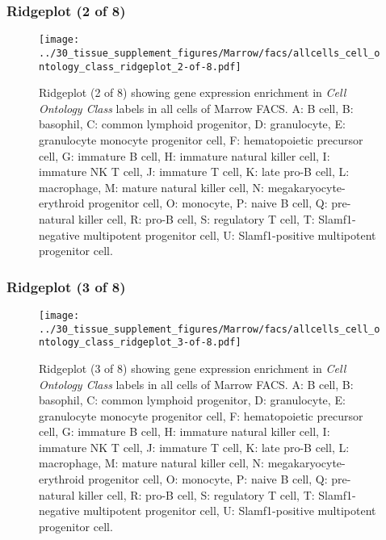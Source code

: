 \clearpage

\subsubsection{Ridgeplot (2 of 8)}
\begin{figure}[h]
\centering
\texttt{[image: ../30\_tissue\_supplement\_figures/Marrow/facs/allcells\_cell\_ontology\_class\_ridgeplot\_2-of-8.pdf]}

\caption{ Ridgeplot (2 of 8)  showing gene expression enrichment in \emph{Cell Ontology Class} labels in all cells of Marrow FACS. A: B cell, B: basophil, C: common lymphoid progenitor, D: granulocyte, E: granulocyte monocyte progenitor cell, F: hematopoietic precursor cell, G: immature B cell, H: immature natural killer cell, I: immature NK T cell, J: immature T cell, K: late pro-B cell, L: macrophage, M: mature natural killer cell, N: megakaryocyte-erythroid progenitor cell, O: monocyte, P: naive B cell, Q: pre-natural killer cell, R: pro-B cell, S: regulatory T cell, T: Slamf1-negative multipotent progenitor cell, U: Slamf1-positive multipotent progenitor cell.}
\end{figure}


\clearpage

\subsubsection{Ridgeplot (3 of 8)}
\begin{figure}[h]
\centering
\texttt{[image: ../30\_tissue\_supplement\_figures/Marrow/facs/allcells\_cell\_ontology\_class\_ridgeplot\_3-of-8.pdf]}

\caption{ Ridgeplot (3 of 8)  showing gene expression enrichment in \emph{Cell Ontology Class} labels in all cells of Marrow FACS. A: B cell, B: basophil, C: common lymphoid progenitor, D: granulocyte, E: granulocyte monocyte progenitor cell, F: hematopoietic precursor cell, G: immature B cell, H: immature natural killer cell, I: immature NK T cell, J: immature T cell, K: late pro-B cell, L: macrophage, M: mature natural killer cell, N: megakaryocyte-erythroid progenitor cell, O: monocyte, P: naive B cell, Q: pre-natural killer cell, R: pro-B cell, S: regulatory T cell, T: Slamf1-negative multipotent progenitor cell, U: Slamf1-positive multipotent progenitor cell.}
\end{figure}


\clearpage


